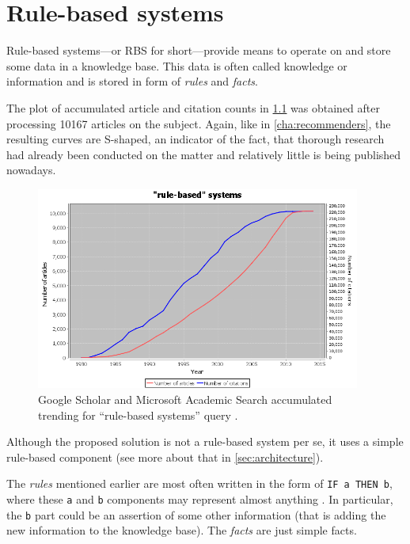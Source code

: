 \chapter{Rule-based systems}
\label{cha:rules}

Rule-based systems---or RBS for short---provide means to operate on and store some data in a knowledge base. This data is often called knowledge or information and is stored in form of \emph{rules} and \emph{facts}.

The plot of accumulated article and citation counts in \cref{fig:scholar-rule-based} was obtained after processing 10167 articles on the subject. Again, like in \cref{cha:recommenders}, the resulting curves are S-shaped, an indicator of the fact, that thorough research had already been conducted on the matter and relatively little is being published nowadays.

\begin{figure}
	\centering
	\includegraphics[width=0.95\textwidth]{scholar-rule-based}
	\caption{Google Scholar and Microsoft Academic Search accumulated trending for ``rule-based systems'' query \cite{Rus:scholar-trends}.}
	\label{fig:scholar-rule-based}
\end{figure}

Although the proposed solution is not a rule-based system per se, it uses a simple rule-based component (see more about that in \cref{sec:architecture}).

The \emph{rules} mentioned earlier are most often written in the form of \texttt{IF~a~THEN~b}, where these \texttt{a} and \texttt{b} components may represent almost anything \cite{Smith:krr}. In particular, the \texttt{b} part could be an assertion of some other information (that is adding the new information to the knowledge base). The \emph{facts} are just simple facts.

